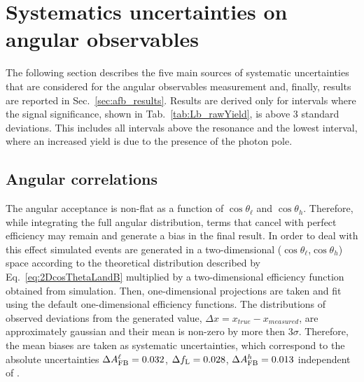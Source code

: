 \section{Systematics uncertainties on angular observables}
\label{sec:ang_results}

The following section describes the five main sources of systematic uncertainties
that are considered for the angular observables measurement and, finally, results are
reported in Sec.~\ref{sec:afb_results}. Results are derived only for \qsq intervals
where the signal significance, shown in Tab.~\ref{tab:Lb_rawYield}, is above 3 standard
deviations. This includes all \qsq intervals above the \jpsi resonance and the lowest 
\qsq interval, where an increased yield is due to the presence of the photon pole.



\subsection{Angular correlations}

The angular acceptance is non-flat as a function of $\cos\theta_\ell$ and $\cos \theta_h$.
Therefore, while integrating the full angular distribution, terms that cancel with perfect efficiency
may remain and generate a bias in the final result. In order to deal with this effect simulated events are
generated in a two-dimensional ($\cos\theta_\ell$,$\cos \theta_h$) space according to the
theoretical distribution described by Eq.~\ref{eq:2DcosThetaLandB} multiplied by a two-dimensional
efficiency function obtained from simulation. %
Then, one-dimensional projections are taken and fit using the default one-dimensional efficiency functions.
The distributions of observed deviations from the generated value, $\Delta x = x_{true} - x_{measured}$,
are approximately gaussian and their mean is non-zero by more then 3$\sigma$.
Therefore, the mean biases are taken as systematic uncertainties, which correspond to the absolute 
uncertainties $\Delta A_{\rm FB}^\ell = 0.032$, $\Delta f_{\rm L} = 0.028$, $\Delta A_{\rm FB}^h = 0.013$ independent of \qsq.

